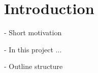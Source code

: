 \section{Introduction}\label{sec:Introduction}

- Short motivation

- In this project ... 

- Outline structure